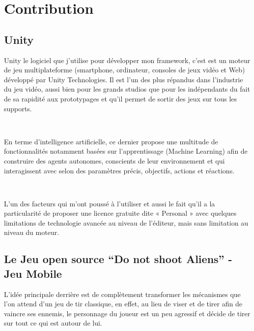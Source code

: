 
\chapter{Contribution} %

\label{Chapter6} %


\section{Unity}

Unity le logiciel que j'utilise pour développer mon framework, c’est est un moteur de jeu multiplateforme (smartphone, ordinateur, consoles de jeux vidéo et Web) développé par Unity Technologies. Il est l'un des plus répandus dans l'industrie du jeu vidéo, aussi bien pour les grands studios que pour les indépendants du fait de sa rapidité aux prototypages et qu'il permet de sortir des jeux sur tous les supports.


~\par
En terme d’intelligence artificielle, ce dernier propose une multitude de fonctionnalités notamment basées sur l’apprentissage (Machine Learning) afin de construire des agents autonomes, conscients de leur environnement et qui interagissent avec selon des paramètres précis, objectifs, actions et réactions.

~\par
L’un des facteurs qui m’ont poussé à l’utiliser et aussi le fait qu'il a la particularité de proposer une licence gratuite dite « Personal » avec quelques limitations de technologie avancée au niveau de l'éditeur, mais sans limitation au niveau du moteur.  



\section{Le Jeu open source “Do not shoot Aliens” - Jeu Mobile}

L'idée principale derrière est de complètement transformer les mécanismes que l’on attend d'un jeu de tir classique, en effet,  au lieu de viser et de tirer afin de vaincre ses ennemis, le personnage du joueur est un peu agressif et décide de tirer sur tout ce qui est autour de lui. 


